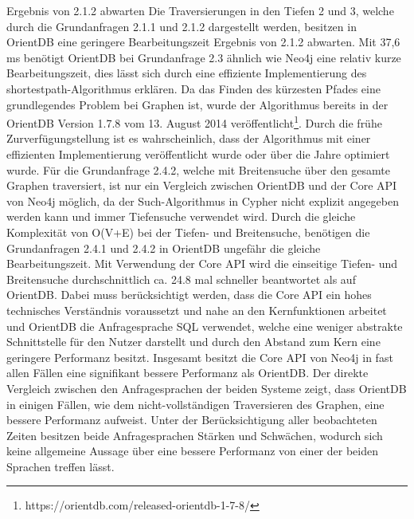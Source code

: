 {\color{red} Ergebnis von 2.1.2 abwarten} Die Traversierungen in den Tiefen 2 und 3, welche durch die Grundanfragen 2.1.1 und 2.1.2 dargestellt werden, besitzen in OrientDB eine geringere Bearbeitungszeit {\color{red} Ergebnis von 2.1.2 abwarten}. \newline  
Mit 37,6 ms benötigt OrientDB bei Grundanfrage 2.3 ähnlich wie Neo4j eine relativ kurze Bearbeitungszeit, dies lässt sich durch eine effiziente Implementierung des shortestpath-Algorithmus erklären. Da das Finden des kürzesten Pfades eine grundlegendes Problem bei Graphen ist, wurde der Algorithmus bereits in der OrientDB Version 1.7.8 vom 13. August 2014 veröffentlicht\footnote{https://orientdb.com/released-orientdb-1-7-8/}. Durch die frühe Zurverfügungstellung ist es wahrscheinlich, dass der Algorithmus mit einer effizienten Implementierung veröffentlicht wurde oder über die Jahre optimiert wurde. \newline
Für die Grundanfrage 2.4.2, welche mit Breitensuche über den gesamte Graphen traversiert, ist nur ein Vergleich zwischen OrientDB und der Core API von Neo4j möglich, da der Such-Algorithmus in Cypher nicht explizit angegeben werden kann und immer Tiefensuche verwendet wird. Durch die gleiche Komplexität von O(V+E) bei der Tiefen- und Breitensuche, benötigen die Grundanfragen 2.4.1 und 2.4.2 in OrientDB ungefähr die gleiche Bearbeitungszeit. Mit Verwendung der Core API wird die einseitige Tiefen- und Breitensuche durchschnittlich ca. 24.8 mal schneller beantwortet als auf OrientDB. Dabei muss berücksichtigt werden, dass die Core API ein hohes technisches Verständnis voraussetzt und nahe an den Kernfunktionen arbeitet und OrientDB die Anfragesprache SQL verwendet, welche eine weniger abstrakte Schnittstelle für den Nutzer darstellt und durch den Abstand zum Kern eine geringere Performanz besitzt. \newline
Insgesamt besitzt die Core API von Neo4j in fast allen Fällen eine signifikant bessere Performanz als OrientDB. Der direkte Vergleich zwischen den Anfragesprachen der beiden Systeme zeigt, dass OrientDB in einigen Fällen, wie dem nicht-vollständigen Traversieren des Graphen, eine bessere Performanz aufweist. Unter der Berücksichtigung aller beobachteten Zeiten besitzen beide Anfragesprachen Stärken und Schwächen, wodurch sich keine allgemeine Aussage über eine bessere Performanz von einer der beiden Sprachen treffen lässt. 
\FloatBarrier
